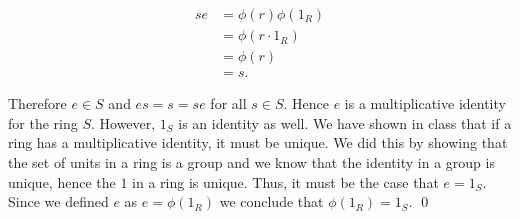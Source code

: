 \documentclass{article}
\begin{document}
\begin{align*}
	se &= \phi(r) \phi(1_R) \\
	&= \phi(r \cdot 1_R) \\
	&= \phi(r) \\
	&= s.
\end{align*}

Therefore $e \in S$ and $es = s = se$ for all $s \in S$. Hence $e$ is a multiplicative identity for the ring $S$. However, $1_S$ is an identity as well. We have shown in class that if a ring has a multiplicative identity, it must be unique. We did this by showing that the set of units in a ring is a group and we know that the identity in a group is unique, hence the $1$ in a ring is unique. Thus, it must be the case that $e = 1_S$. Since we defined $e$ as $e = \phi(1_R)$ we conclude that $\phi(1_R) = 1_S$. \qed \\
\end{document}
